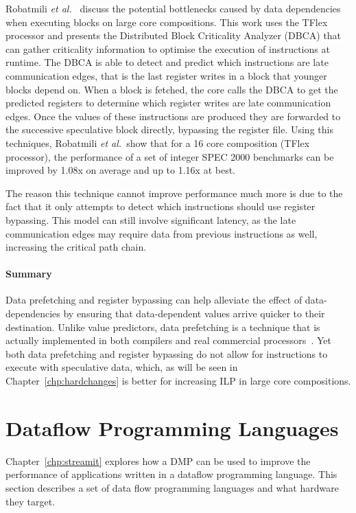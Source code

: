 Robatmili {\it et al.~}\cite{robatmili2011uniproc} discuss the potential bottlenecks caused by data dependencies when executing blocks on large core compositions.
This work uses the TFlex processor and presents the Distributed Block Criticality Analyzer (DBCA) that can gather criticality information to optimise the execution of instructions at runtime.
The DBCA is able to detect and predict which instructions are late communication edges, that is the last register writes in a block that younger blocks depend on.
When a block is fetched, the core calls the DBCA to get the predicted registers to determine which register writes are late communication edges.
Once the values of these instructions are produced they are forwarded to the successive speculative block directly, bypassing the register file.
Using this techniques, Robatmili {\it et al.~}show that for a 16 core composition (TFlex processor), the performance of a set of integer SPEC 2000 benchmarks can be improved by 1.08x on average and up to 1.16x at best.

The reason this technique cannot improve performance much more is due to the fact that it only attempts to detect which instructions should use register bypassing.
This model can still involve significant latency, as the late communication edges may require data from previous instructions as well, increasing the critical path chain.

\vspace{-1em}
\paragraph*{Summary}
Data prefetching and register bypassing can help alleviate the effect of data-dependencies by ensuring that data-dependent values arrive quicker to their destination.
Unlike value predictors, data prefetching is a technique that is actually implemented in both compilers and real commercial processors~\cite{intelmanual}.
Yet both data prefetching and register bypassing do not allow for instructions to execute with speculative data, which, as will be seen in Chapter~\ref{chp:hardchanges} is better for increasing ILP in large core compositions.
\vspace{-1em}
\section{Dataflow Programming Languages}

Chapter~\ref{chp:streamit} explores how a DMP can be used to improve the performance of applications written in a dataflow programming language.
This section describes a set of data flow programming languages and what hardware they target.


